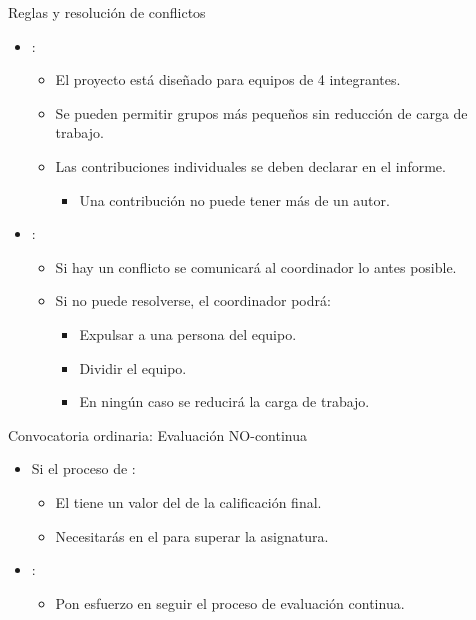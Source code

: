 \begin{frame}[t]{Reglas y resolución de conflictos}
\begin{itemize}
  \item {}:
    \begin{itemize}
      \item El proyecto está diseñado para equipos de 4 integrantes.
      \item Se pueden permitir grupos más pequeños sin reducción de carga de trabajo.
      \item Las contribuciones individuales se deben declarar en el informe.
        \begin{itemize}
          \item Una contribución no puede tener más de un autor.
        \end{itemize}
    \end{itemize}

  \item {}:
    \begin{itemize}
      \item Si hay un conflicto se comunicará al coordinador lo antes posible.
      \item Si no puede resolverse, el coordinador podrá:
        \begin{itemize}
          \item Expulsar a una persona del equipo.
          \item Dividir el equipo.
          \item En ningún caso se reducirá la carga de trabajo.
        \end{itemize}
    \end{itemize}
\end{itemize}
\end{frame}


\begin{frame}[t]{Convocatoria ordinaria: Evaluación NO-continua}
\begin{itemize}
  \item Si  el proceso de :
    \begin{itemize}
      \item El  tiene un valor del 
             de la calificación final.
      \item Necesitarás  en el  
            para superar la asignatura.
    \end{itemize}

  \item {}:
    \begin{itemize}
      \item Pon esfuerzo en seguir el proceso de evaluación continua.
    \end{itemize}
\end{itemize}
\end{frame}


